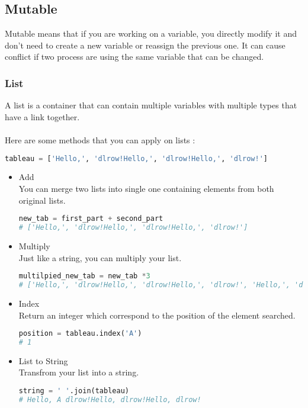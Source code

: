 \documentclass[a4paper, 12pt]{article}
\begin{document}
\subsection{Mutable}
Mutable means that if you are working on a variable, you directly modify it and don't need to create a new variable or reassign the previous one. It can cause conflict if two process are using the same variable that can be changed.\newline

\subsubsection{List}
A list is a container that can contain multiple variables with multiple types that have a link together.\\ \\
Here are some methods that you can apply on lists : 

\begin{lstlisting}[language=Python]
tableau = ['Hello,', 'dlrow!Hello,', 'dlrow!Hello,', 'dlrow!']
\end{lstlisting}

\begin{itemize}
\item Add \\
You can merge two lists into single one containing elements from both original lists.
\begin{lstlisting}[language=Python]
new_tab = first_part + second_part
# ['Hello,', 'dlrow!Hello,', 'dlrow!Hello,', 'dlrow!']
\end{lstlisting}

\item Multiply \\
Just like a string, you can multiply your list.
\begin{lstlisting}[language=Python]
multilpied_new_tab = new_tab *3
# ['Hello,', 'dlrow!Hello,', 'dlrow!Hello,', 'dlrow!', 'Hello,', 'dlrow!Hello,', 'dlrow!Hello,', 'dlrow!', 'Hello,', 'dlrow!Hello,', 'dlrow!Hello,', 'dlrow!']
\end{lstlisting}

\item Index \\
Return an integer which correspond to the position of the element searched.
\begin{lstlisting}[language=Python]
position = tableau.index('A')
# 1
\end{lstlisting}

\item List to String \\
Transfrom your list into a string.
\begin{lstlisting}[language=Python]
string = ' '.join(tableau)
# Hello, A dlrow!Hello, dlrow!Hello, dlrow!
\end{lstlisting}
\end{itemize}
\end{document}
